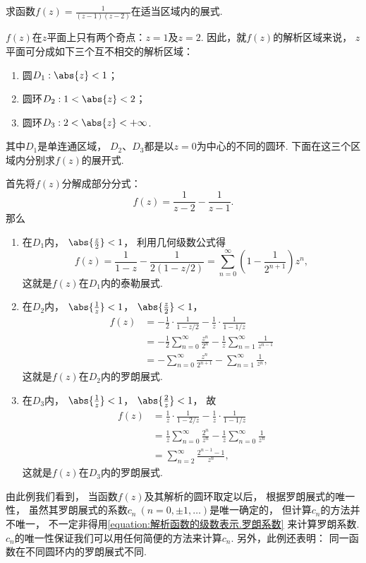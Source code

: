 \begin{example}
求函数\(f(z) = \frac{1}{(z-1)(z-2)}\)在适当区域内的展式.
\begin{solution}
\(f(z)\)在\(z\)平面上只有两个奇点：\(z=1\)及\(z=2\).
因此，就\(f(z)\)的解析区域来说，
\(z\)平面可分成如下三个互不相交的解析区域：
\begin{enumerate}
	\item 圆\(D_1: \abs{z}<1\)；
	\item 圆环\(D_2: 1<\abs{z}<2\)；
	\item 圆环\(D_3: 2<\abs{z}<+\infty\).
\end{enumerate}
其中\(D_1\)是单连通区域，
\(D_2\)、\(D_3\)都是以\(z=0\)为中心的不同的圆环.
下面在这三个区域内分别求\(f(z)\)的展开式.

首先将\(f(z)\)分解成部分分式：\begin{equation*}
	f(z) = \frac{1}{z-2} - \frac{1}{z-1}.
\end{equation*}
那么\begin{enumerate}
	\item 在\(D_1\)内，
	\(\abs{\frac{z}{2}}<1\)，
	利用几何级数公式得\begin{equation*}
		f(z) = \frac{1}{1-z} - \frac{1}{2 (1-z/2)}
		= \sum_{n=0}^\infty \left(1 - \frac{1}{2^{n+1}}\right) z^n,
	\end{equation*}
	这就是\(f(z)\)在\(D_1\)内的泰勒展式.

	\item 在\(D_2\)内，
	\(\abs{\frac{1}{z}}<1\)，
	\(\abs{\frac{z}{2}}<1\)，
	\begin{align*}
		f(z) &= -\frac{1}{2}\cdot\frac{1}{1-z/2}
			- \frac{1}{z}\cdot\frac{1}{1-1/z} \\
		&= -\frac{1}{2} \sum_{n=0}^\infty \frac{z^n}{2^n}
			- \frac{1}{z} \sum_{n=1}^\infty \frac{1}{z^{n-1}} \\
		&= -\sum_{n=0}^\infty \frac{z^n}{2^{n+1}}
			- \sum_{n=1}^\infty \frac{1}{z^n},
	\end{align*}
	这就是\(f(z)\)在\(D_2\)内的罗朗展式.

	\item 在\(D_3\)内，
	\(\abs{\frac{1}{z}}<1\)，
	\(\abs{\frac{2}{z}}<1\)，
	故\begin{align*}
		f(z) &= \frac{1}{z}\cdot\frac{1}{1-2/z}
			- \frac{1}{z}\cdot\frac{1}{1-1/z} \\
		&= \frac{1}{z} \sum_{n=0}^\infty \frac{2^n}{z^n}
			- \frac{1}{z} \sum_{n=0}^\infty \frac{1}{z^n} \\
		&= \sum_{n=2}^\infty \frac{2^{n-1}-1}{z^n},
	\end{align*}
	这就是\(f(z)\)在\(D_3\)内的罗朗展式.
\end{enumerate}
\end{solution}
由此例我们看到，
当函数\(f(z)\)及其解析的圆环取定以后，
根据罗朗展式的唯一性，
虽然其罗朗展式的系数\(c_n\ (n=0,\pm1,\dotsc)\)是唯一确定的，
但计算\(c_n\)的方法并不唯一，
不一定非得用\cref{equation:解析函数的级数表示.罗朗系数} 来计算罗朗系数.
\(c_n\)的唯一性保证我们可以用任何简便的方法来计算\(c_n\).
另外，此例还表明：
同一函数在不同圆环内的罗朗展式不同.
\end{example}

